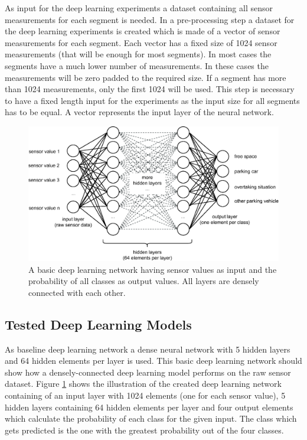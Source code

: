As input for the deep learning experiments a dataset containing all sensor measurements for each segment is needed. In a pre-processing step a dataset for the deep learning experiments is created which is made of a vector of sensor measurements for each segment. Each vector has a fixed size of 1024 sensor measurements (that will be enough for most segments). In most cases the segments have a much lower number of measurements. In these cases the measurements will be zero padded to the required size. If a segment has more than 1024 measurements, only the first 1024 will be used. This step is necessary to have a fixed length input for the experiments as the input size for all segments has to be equal. A vector represents the input layer of the neural network. 

\begin{figure}
	\centering
	\includegraphics[width=\textwidth]{img/deep_learning_basic_model_2.eps}
	\caption{A basic deep learning network having sensor values as input and the probability of all classes as output values. All layers are densely connected with each other.}
	\label{fig:densely_dl_network}
\end{figure}





\subsection{Tested Deep Learning Models}

As baseline deep learning network a dense neural network with 5 hidden layers and 64 hidden elements per layer is used. This basic deep learning network should show how a densely-connected deep learning model performs on the raw sensor dataset. Figure \ref{fig:densely_dl_network} shows the illustration of the created deep learning network containing of an input layer with 1024 elements (one for each sensor value), 5 hidden layers containing 64 hidden elements per layer and four output elements which calculate the probability of each class for the given input. The class which gets predicted is the one with the greatest probability out of the four classes. 

